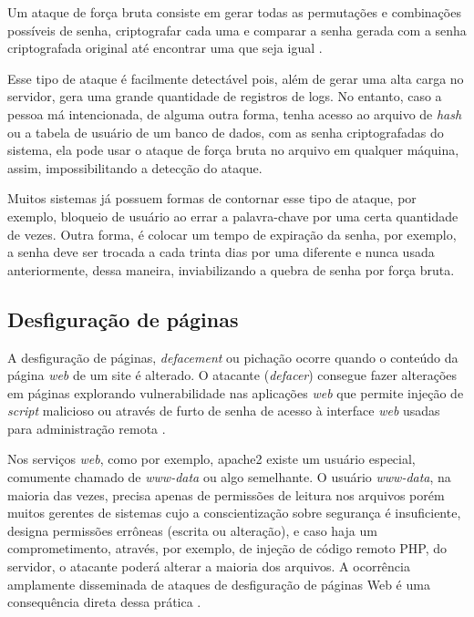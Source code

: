  Um ataque de força bruta consiste em gerar todas as permutações e combinações possíveis de senha, criptografar cada uma e comparar a senha gerada com a senha criptografada original até encontrar uma que seja igual \cite{md5crack2012}. 

 Esse tipo de ataque é facilmente detectável pois, além de gerar uma alta carga no servidor, gera uma grande quantidade de registros de logs. No entanto, caso a pessoa má intencionada, de alguma outra forma, tenha acesso ao arquivo de \textit{hash} ou a tabela de usuário de um banco de dados, com as senha criptografadas do sistema, ela pode usar o ataque de força bruta no arquivo em qualquer máquina, assim, impossibilitando a detecção do ataque.

 Muitos sistemas já possuem formas de contornar esse tipo de ataque, por exemplo, bloqueio de usuário ao errar a palavra-chave por uma certa quantidade de vezes. Outra forma, é colocar um tempo de expiração da senha, por exemplo, a senha deve ser trocada a cada trinta dias por uma diferente e nunca usada anteriormente, dessa maneira, inviabilizando a quebra de senha por força bruta. 

\subsection{Desfiguração de páginas} \label{sec:desfiguração}

A desfiguração de páginas, \textit{defacement} ou pichação ocorre quando o conteúdo da página \textit{web} de um site é alterado. O atacante (\textit{defacer}) consegue fazer alterações em páginas explorando vulnerabilidade nas aplicações \textit{web} que permite injeção de \textit{script} malicioso ou através de furto de senha de acesso à interface \textit{web} usadas para administração remota \cite{certs-ataques}.

Nos serviços \textit{web}, como por exemplo, apache2 existe um usuário especial, comumente chamado de \textit{www-data} ou algo semelhante. O usuário \textit{www-data}, na maioria das vezes, precisa apenas de permissões de leitura nos arquivos porém muitos gerentes de sistemas cujo a conscientização sobre segurança é insuficiente, designa permissões errôneas (escrita ou alteração), e caso haja um comprometimento, através, por exemplo, de injeção de código remoto PHP, do servidor, o atacante poderá alterar a maioria dos arquivos. A ocorrência amplamente disseminada de ataques de desfiguração de páginas Web é uma consequência direta dessa prática \cite{seguranca:william-lawrie}.


